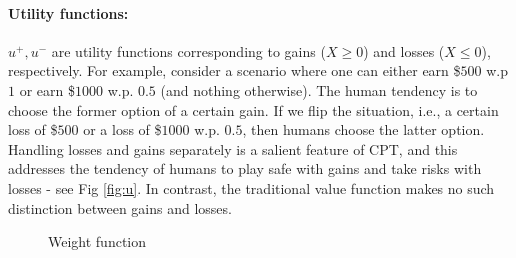 \documentclass[11pt,letterpaper,english]{article}
\begin{document}
\paragraph{Utility functions:} $u^+, u^-$ are utility functions corresponding to gains ($X \ge 0$) and losses ($X \le 0$), respectively. For example, consider a scenario where one can either earn \$$500$ w.p $1$ or earn \$$1000$ w.p. $0.5$ (and nothing otherwise). The human tendency is to choose the former option of a certain gain. If we flip the situation, i.e., a certain loss of \$$500$ or a loss of \$$1000$ w.p. $0.5$, then humans choose the latter option.  Handling losses and gains separately is a salient feature of CPT, and this addresses the tendency of humans to play safe with gains and take risks with losses - see Fig \ref{fig:u}.  In contrast, the traditional value function makes no such distinction between gains and losses.  

\begin{figure}[h]
\centering
{}
\caption{Weight function}
\label{fig:w}
\end{figure}
\end{document}
